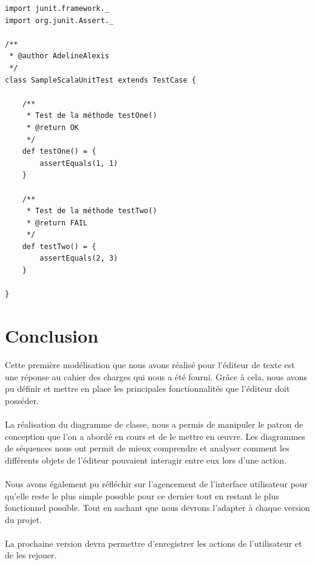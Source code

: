 \documentclass[a4paper,11pt]{article}
\begin{document}
\newpage
\begin{lstlisting}[caption=Exemple de TU Scala, label=java]
import junit.framework._
import org.junit.Assert._

/**
 * @author AdelineAlexis
 */
class SampleScalaUnitTest extends TestCase {

	/**
	 * Test de la méthode testOne()
	 * @return OK
	 */
	def testOne() = {
		assertEquals(1, 1)
	}

	/**
	 * Test de la méthode testTwo()
	 * @return FAIL
	 */
	def testTwo() = {
		assertEquals(2, 3)
	}

}

\end{lstlisting}	



\newpage
\section{Conclusion}
Cette première modélisation que nous avons réalisé pour l'éditeur de texte est une réponse au cahier des charges qui nous a été fourni. Grâce à cela, nous avons pu définir et mettre en place les principales fonctionnalités que l'éditeur doit posséder. 

\paragraph{}
La réalisation du diagramme de classe, nous a permis de manipuler le patron de conception que l'on a abordé en cours et de le mettre en œuvre. Les diagrammes de séquences nous ont permit de mieux comprendre et analyser comment les différents objets de l'éditeur pouvaient interagir entre eux lors d'une action. 

\paragraph{}
Nous avons également pu réfléchir sur l'agencement de l'interface utilisateur pour qu'elle reste le plus simple possible pour ce dernier tout en restant le plus fonctionnel possible. Tout en sachant que nous devrons l'adapter à chaque version du projet. 

\paragraph{}
La prochaine version devra permettre d'enregistrer les actions de l'utilisateur et de les rejouer. 




\newpage
\listoffigures  %
\listoftables
\newpage
\nocite{*}
\newpage
\end{document}
